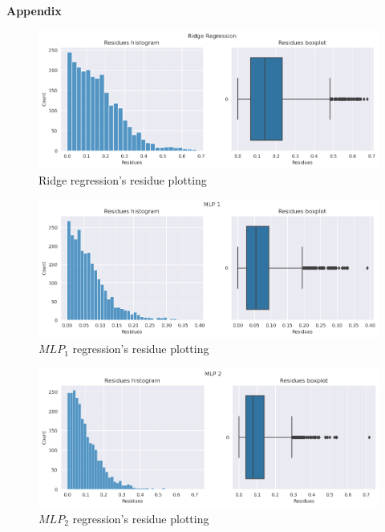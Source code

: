 \documentclass[12pt]{article}
\begin{document}
\pagebreak

\large{\textbf{Appendix}\vskip 0.3cm}




\begin{figure}[h]
  \centering
  \includegraphics[width=\textwidth]{../assets/ridge-plots.png}
  \caption{Ridge regression's residue plotting}
  \label{fig:ridge-plotting}
\end{figure}

\begin{figure}[h]
  \centering
  \includegraphics[width=\textwidth]{../assets/mlp1-plots.png}
  \caption{$MLP_1$ regression's residue plotting}
  \label{fig:mlp1-plotting}
\end{figure}

\begin{figure}[h]
  \centering
  \includegraphics[width=\textwidth]{../assets/mlp2-plots.png}
  \caption{$MLP_2$ regression's residue plotting}
  \label{fig:mlp2-plotting}
\end{figure}
\end{document}
